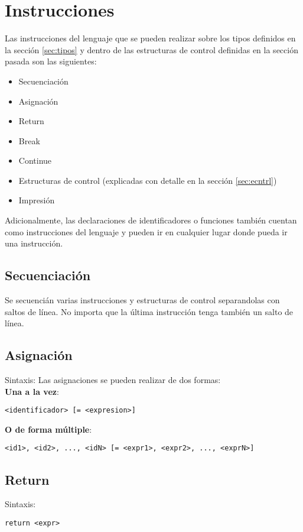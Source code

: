 \documentclass[12pt, spanish]{report}
\begin{document}
\chapter{Instrucciones}
\label{sec:instr}

Las instrucciones del lenguaje que se pueden realizar sobre los tipos
definidos en la secci\'on \ref{sec:tipos} y dentro de las estructuras
de control definidas en la secci\'on pasada son las siguientes:

\begin{itemize}
\item Secuenciaci\'on
\item Asignaci\'on
\item Return
\item Break
\item Continue
\item Estructuras de control (explicadas con detalle en la secci\'on \ref{sec:ecntrl})
\item Impresi\'on
\end{itemize}

Adicionalmente, las declaraciones de identificadores o funciones
tambi\'en cuentan como instrucciones del lenguaje y pueden ir en
cualquier lugar donde pueda ir una instrucci\'on.

\section{Secuenciaci\'on}
Se secuenci\'an varias instrucciones y estructuras de control
separandolas con saltos de l\'inea. No importa que la \'ultima
instrucci\'on tenga tambi\'en un salto de l\'inea.

\section{Asignaci\'on}
Sintaxis:
Las asignaciones se pueden realizar de dos formas:\\

\textbf{Una a la vez}:
\begin{verbatim}
<identificador> [= <expresion>]
\end{verbatim}

\textbf{O de forma m\'ultiple}:
\begin{verbatim}
<id1>, <id2>, ..., <idN> [= <expr1>, <expr2>, ..., <exprN>]
\end{verbatim}

\section{Return}
\label{sec:return}
Sintaxis:
\begin{verbatim}
return <expr>
\end{verbatim}
\end{document}
